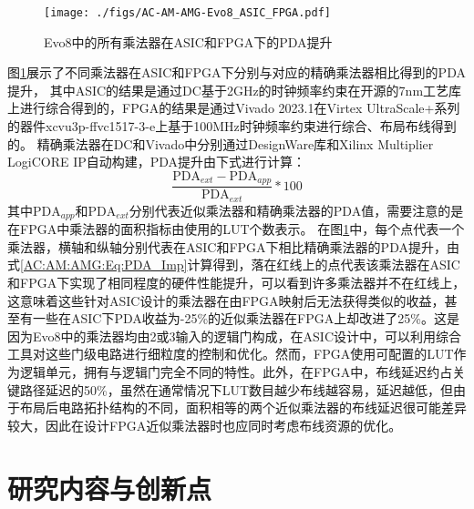 \begin{figure}[!ht]
    \centering
    \texttt{[image: ./figs/AC-AM-AMG-Evo8\_ASIC\_FPGA.pdf]}
    \caption{Evo8中的所有乘法器在ASIC和FPGA下的PDA提升}
    \label{AC:AM:AMG:Fig:Evo8_ASIC_FPGA.pdf}
\end{figure}

图\ref{AC:AM:AMG:Fig:Evo8_ASIC_FPGA.pdf}展示了不同乘法器在ASIC和FPGA下分别与对应的精确乘法器相比得到的PDA提升，
其中ASIC的结果是通过DC基于2GHz的时钟频率约束在开源的7nm工艺库\cite{ASAP7_github}上进行综合得到的，FPGA的结果是通过Vivado 2023.1在Virtex UltraScale+系列的器件xcvu3p-ffvc1517-3-e上基于100MHz时钟频率约束进行综合、布局布线得到的。
精确乘法器在DC和Vivado中分别通过DesignWare库\cite{IP:DesignWare}和Xilinx Multiplier LogiCORE IP\cite{IP:LogiCORE}自动构建，PDA提升由下式进行计算：
\begin{equation}
    \label{AC:AM:AMG:Eq:PDA_Imp}
    \frac{\text{PDA}_{ext} - \text{PDA}_{app}}{\text{PDA}_{ext}} *100
\end{equation}
其中$\text{PDA}_{app}$和$\text{PDA}_{ext}$分别代表近似乘法器和精确乘法器的PDA值，需要注意的是在FPGA中乘法器的面积指标由使用的LUT个数表示。
在图\ref{AC:AM:AMG:Fig:Evo8_ASIC_FPGA.pdf}中，每个点代表一个乘法器，横轴和纵轴分别代表在ASIC和FPGA下相比精确乘法器的PDA提升，由式\eqref{AC:AM:AMG:Eq:PDA_Imp}计算得到，落在红线上的点代表该乘法器在ASIC和FPGA下实现了相同程度的硬件性能提升，可以看到许多乘法器并不在红线上，这意味着这些针对ASIC设计的乘法器在由FPGA映射后无法获得类似的收益，甚至有一些在ASIC下PDA收益为-25\%的近似乘法器在FPGA上却改进了25\%。这是因为Evo8\cite{AC:AM:CGP_Evoapprox8b}中的乘法器均由2或3输入的逻辑门构成，在ASIC设计中，可以利用综合工具对这些门级电路进行细粒度的控制和优化。然而，FPGA使用可配置的LUT作为逻辑单元，拥有与逻辑门完全不同的特性。此外，在FPGA中，布线延迟约占关键路径延迟的50\%\cite{FPGA:Vaughn}，虽然在通常情况下LUT数目越少布线越容易，延迟越低，但由于布局后电路拓扑结构的不同，面积相等的两个近似乘法器的布线延迟很可能差异较大，因此在设计FPGA近似乘法器时也应同时考虑布线资源的优化。

\section{研究内容与创新点}

